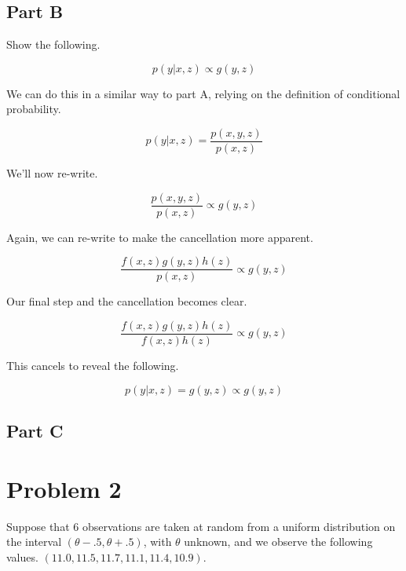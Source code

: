 \documentclass[12pt, letterpaper]{article}
\begin{document}
\subsection{Part B} 

Show the following. 

\begin{equation}
p(y | x, z) \propto g(y, z) 
\end{equation} 

We can do this in a similar way to part A, relying on the definition of conditional probability. 

\begin{equation} 
p(y | x, z) = \frac{p(x, y, z)}{p(x, z)} 
\end{equation} 

We'll now re-write. 

\begin{equation} 
\frac{p(x, y, z)}{p(x, z)} \propto g(y, z) 
\end{equation} 

Again, we can re-write to make the cancellation more apparent. 

\begin{equation} 
\frac{f(x, z) g(y, z) h(z)}{p(x, z)} \propto g(y, z)
\end{equation} 

Our final step and the cancellation becomes clear. 

\begin{equation} 
\frac{f(x, z) g(y, z) h(z)}{f(x, z) h(z)} \propto g(y, z) 
\end{equation} 

This cancels to reveal the following. 

\begin{equation} 
p(y | x, z) = g(y, z) \propto g(y, z) 
\end{equation} 

\subsection{Part C} 



\section{Problem 2}

Suppose that 6 observations are taken at random from a uniform distribution on the interval $(\theta - .5 , \theta + .5)$, with $\theta$ unknown, and we observe the following values. $(11.0, 11.5, 11.7, 11.1, 11.4, 10.9)$. 
\end{document}
